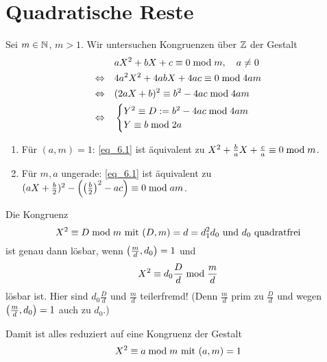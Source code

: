 \section{Quadratische Reste}
\label{sec:para6}

	Sei $m \in \NN$, $m > 1$. Wir untersuchen Kongruenzen über $\ZZ$ der Gestalt 
	\begin{align}
		& aX^2 + bX + c \kon 0 \modu m, \quad a \neq 0 \label{eq_6.1} \\ 
		\Leftrightarrow \quad & 4a^2X^2 + 4abX + 4ac \kon 0 \modu 4am \\ 
		\Leftrightarrow \quad & (2aX + b)^2 \kon b^2 - 4ac \modu 4am \label{eq_6.2} \\ 
		\Leftrightarrow \quad & \begin{cases}
			Y^2 \kon D := b^2 - 4ac \modu 4am \\
			Y \kon b \modu 2a
		\end{cases} \label{eq_6.3}
	\end{align}

	\begin{enumerate}[1)]
		\item Für $(a,m) = 1$: \eqref{eq_6.1} ist äquivalent zu $X^2 + \frac{b}{a}X + \frac{c}{a} \kon 0 \modu m$.
		\item Für $m, a$ ungerade: \eqref{eq_6.1} ist äquivalent zu $(aX + \frac{b}{2})^2 - \enbrace*{ \enbrace*{\frac{b}{2}}^2 - ac} \kon 0 \modu am$.
	\end{enumerate}

\begin{falko} \label{F6.1}
	Die Kongruenz
	\begin{equation}
		X^2 \kon D \modu m \text{ mit } (D,m) = d = d_1^2 d_0 \text{ und } d_0 \text{ quadratfrei} \label{eq_6.4}
	\end{equation}
	ist genau dann lösbar, wenn $\enbrace*{\frac{m}{d},d_0} = 1$ und
	\begin{equation}
		X^2 \kon d_0 \frac{D}{d} \modu \frac{m}{d} \label{eq_6.5}
	\end{equation}
	lösbar ist. Hier sind $d_0 \frac{D}{d}$ und $\frac{m}{d}$ teilerfremd! (Denn $\frac{m}{d}$ prim zu $\frac{D}{d}$ und wegen $\enbrace*{\frac{m}{d},d_0} = 1$ auch zu $d_0$.)
\end{falko}

Damit ist alles reduziert auf eine Kongruenz der Gestalt
\begin{equation}
	X^2 \kon a \modu m \text{ mit } (a,m) = 1 \label{eq_6_stern}
\end{equation}


